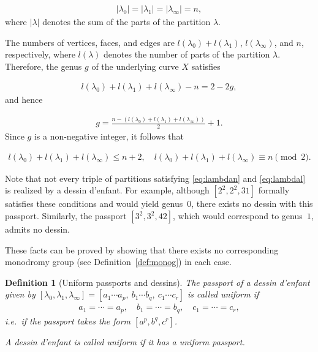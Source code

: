 \documentclass[12pt,reqno]{amsart}
\newcommand{\la}{\lambda}								%
\newcommand{\q}{\quad}									%
\newcommand{\f}[2]{\frac{#1}{#2}}							%
\newcommand{\npmod}[1]{\!\!\!\! \pmod{#1}}					%
\newcommand{\ie}{i.e.\ }									%
\theoremstyle{mythmstyle}
\theoremstyle{mydefstyle}
\newtheorem{definition}[lemma]{Definition}
\newcommand{\defref}[1]{Definition~\ref{#1}}
\newcommand{\dde}{dessin d'enfant\xspace}
\numberwithin{equation}{section}
\begin{document}
\begin{align}
\label{eq:lambdan}
\lvert \lambda_{0} \rvert = \lvert \lambda_{1} \rvert = \lvert \lambda_{\infty} \rvert = n,
\end{align}
where $\lvert \la \rvert$ denotes the sum of the parts of the partition $\la$. 

The numbers of vertices, faces, and edges are $l(\lambda_{0}) + l(\lambda_{1})$,
$l(\lambda_{\infty})$, and $n$, respectively, where $l(\la)$ denotes the number of parts
of the partition $\la$.
Therefore, the genus $g$ of the underlying curve $X$ satisfies

\begin{align}
l(\lambda_{0}) + l(\lambda_{1}) + l(\lambda_{\infty}) - n = 2 - 2g,
\end{align}
and hence

\begin{align}
\label{eq:lambdag}
g = \f{n - (l(\lambda_{0}) + l(\lambda_{1}) + l(\lambda_{\infty}))}{2} + 1.
\end{align}
Since $g$ is a non-negative integer, it follows that

\begin{align}
\label{eq:lambdal}
l(\lambda_{0}) + l(\lambda_{1}) + l(\lambda_{\infty}) \le  n + 2, \q
l(\lambda_{0}) + l(\lambda_{1}) + l(\lambda_{\infty}) \equiv n \npmod{2}.
\end{align}

Note that not every triple of partitions satisfying \eqref{eq:lambdan} and \eqref{eq:lambdal}
is realized by a \dde.
For example, although $[2^{2}, 2^{2}, 31]$ formally satisfies these conditions and would yield genus~$0$,
there exists no dessin with this passport.
Similarly, the passport $[3^{2}, 3^{2}, 42]$, which would correspond to genus~$1$, admits no dessin.

These facts can be proved by showing that there exists no corresponding monodromy group
(see \defref{def:monog}) in each case.

\begin{definition}[Uniform passports and dessins]\cite[Remark~3.2]{Jones16}
The passport of a \dde given by
$[\lambda_{0}, \lambda_{1}, \lambda_{\infty}] = [a_{1}\cdots a_{p},\ b_{1}\cdots b_{q},\ c_{1}\cdots c_{r}]$
is called \emph{uniform} if
\begin{align}
a_{1} = \cdots = a_{p}, \quad b_{1} = \cdots = b_{q}, \quad c_{1} = \cdots = c_{r},
\end{align}
\ie if the passport takes the form $[a^{p}, b^{q}, c^{r}]$.

A \dde is called \emph{uniform} if it has a uniform passport.
\end{definition}
\end{document}
